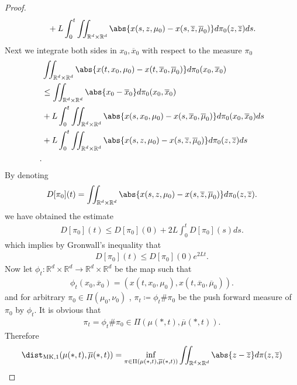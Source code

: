 \begin{proof}
\begin{alignat*}{3}
  &  &&+L \int_0^{t} \iint_{\mathbb{R}^{d} \times  \mathbb{R}^{d}  }  \abs{x(s,z,\mu_0) - x(s,\overline{z},\overline{\mu }_0  )}  d\pi_0(z,\overline{z} ) ds
.\end{alignat*}
Next we integrate both sides in $x_{0},\overline{x}_0 $ with respect to the measure $\pi_0$
\begin{align*}
  &\iint_{\mathbb{R}^{d} \times  \mathbb{R}^{d}  }\abs{x(t,x_{0},\mu_0) - x(t,\overline{x}_0,\overline{\mu }_0  )} d\pi_0(x_{0},\overline{x}_0 )\\
  &\le  \iint_{\mathbb{R}^{d}\times \mathbb{R}^{d}  }\abs{x_{0}-\overline{x}_0 } d\pi_0(x_{0},\overline{x}_0 )\\
  &+ L \int_0^{t} \iint_{\mathbb{R}^{d} \times  \mathbb{R}^{d}  }   \abs{x(s,x_{0},\mu_0)-x(s,\overline{x}_0,\overline{\mu }_0  )} d\pi_0(x_{0},\overline{x}_0 ) ds\\
  &+ L \int_0^{t} \iint_{\mathbb{R}^{d} \times  \mathbb{R}^{d}  }   \abs{x(s,z,\mu_0)-x(s,\overline{z},\overline{\mu }_0  )} d\pi_0(z,\overline{z}  ) ds\\
.\end{align*}
By denoting 
\begin{align*}
  D[\pi_0](t) = \iint_{\mathbb{R}^{d}\times \mathbb{R}^{d}  }\abs{x(s,z,\mu_0)-x(s,\overline{z},\overline{\mu }_0  )} d\pi_0(z,\overline{z} )
.\end{align*}
we have obtained the estimate 
\begin{align*}
  D[\pi_0](t) \le  D[\pi_0](0) + 2L\int_0^{t}D[\pi_{0}] (s) ds
.\end{align*}
which implies by Gronwall's inequality that 
\begin{align*}
  D[\pi_0](t) \le D[\pi_0](0)e^{2Lt} 
.\end{align*}
Now let $\phi_t : \mathbb{R}^{d} \times  \mathbb{R}^{d} \to  \mathbb{R}^{d} \times  \mathbb{R}^{d}    $ be the map such that 
\begin{align*}
  \phi_t(x_{0},\overline{x}_0 ) = (x(t,x_{0},\mu_0),x(t,\overline{x}_0,\overline{\mu }_0  ))
.\end{align*}
and for arbitrary $\pi_0 \in  \Pi(\mu_0,\nu_0)$ , $\pi_t \coloneqq  \phi_t \# \pi_0$ be the push forward measure of $\pi_0$ by $\phi_t$.
It is obvious that 
\begin{align*}
  \pi_t = \phi_t \# \pi_0 \in  \Pi(\mu(*,t),\overline{\mu }(*,t) )
.\end{align*}
Therefore 
\begin{align*}
  \dist_{\text{MK},1}(\mu(*,t),\overline{\mu }(*,t) ) &= \inf_{\pi \in \Pi(\mu(*,t),\overline{\mu }(*,t) ) } \iint_{\mathbb{R}^{d} \times  \mathbb{R}^{d}  } \abs{z-\overline{z} } d\pi(z,\overline{z} )\\

\end{align*}
\end{proof}
